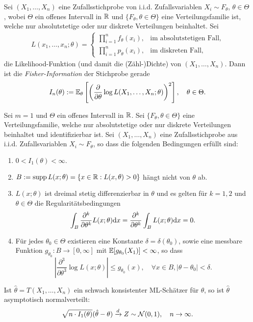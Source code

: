 \begin{defn}
  Sei $(X_1, \ldots, X_n)$ eine Zufallsstichprobe von i.i.d. Zufallsvariablen
  $X_i \sim F_\theta$, $\theta \in \Theta$, wobei $\Theta$ ein offenes Intervall
  in $\mathbb{R}$ und $\{ F_\theta, \theta \in \Theta \}$ eine Verteilungsfamilie
  ist, welche nur absolutstetige oder nur diskrete Verteilungen beinhaltet.
  Sei
  \[ \begin{aligned}
      L(x_1, \ldots, x_n; \theta) = \begin{cases}
        \prod_{i=1}^n f_\theta(x_i), &
        \text{im absolutstetigen Fall,} \\
        \prod_{i=1}^n p_\theta(x_i), &
        \text{im diskreten Fall,}
      \end{cases}
    \end{aligned}
  \]
  die Likelihood-Funktion (und damit die (Zähl-)Dichte) von $(X_1, \ldots,
  X_n)$. Dann ist die \emph{Fisher-Information} der Stichprobe gerade
  \[ I_n(\theta) := \mathbb{E}_\theta \left[ 
      \left( \frac{\partial }{\partial \theta} \log L(X_1, \ldots, X_n; \theta) \right)^2
    \right], \quad \theta \in \Theta. \]
\end{defn}

\begin{thm} 
  Sei $m=1$ und $\Theta$ ein offenes Intervall in $\mathbb{R}$. Sei $\{ F_\theta,
  \theta \in \Theta \}$ eine Verteilungsfamilie, welche nur absolutstetige oder
  nur diskrete Verteilungen beinhaltet und identifizierbar ist. Sei
  $(X_1, \ldots, X_n)$ eine Zufallsstichprobe aus i.i.d. Zufallsvariablen $X_i
  \sim F_\theta$, so dass die folgenden Bedingungen erfüllt sind:
  \begin{enumerate}
  \item $0 < I_1(\theta) < \infty$.
  \item $B := \operatorname{supp} L(x; \theta) = \{ x \in \mathbb{R} : L(x,\theta) >
    0 \}$ hängt nicht von $\theta$ ab.
  \item $L(x;\theta)$ ist dreimal stetig differenzierbar in $\theta$ und es
    gelten für $k = 1,2$ und $\theta \in \Theta$ die Regularitätsbedingungen
    \[ \int_B \frac{\partial^k}{\partial \theta^k} L(x;\theta) \mathrm{d} x
      = \frac{\partial^k}{\partial \theta^k} \int_B L(x;\theta) \mathrm{d} x =
      0. \]
  \item Für jedes $\theta_0 \in \Theta$ existieren eine Konstante $\delta =
    \delta( \theta_0 )$, sowie eine messbare Funktion $g_{\theta_0} : B \to
    [0, \infty]$ mit $\mathbb{E}[g_{\theta_0}(X_1)] < \infty$, so dass
    \[ \left| \frac{\partial^3}{\partial \theta^3} \log L(x;\theta) \right|
      \le g_{\theta_0} (x), \quad \forall x \in B, |\theta-\theta_0| < \delta. \]
  \end{enumerate}
  Ist $\hat{\theta} = T(X_1, \ldots, X_n)$ ein schwach konsistenter ML-Schätzer
  für $\theta$, so ist $\hat{\theta}$ asymptotisch normalverteilt:
  \[ \sqrt{n \cdot I_1(\theta)} (\hat{\theta} - \theta) \xrightarrow{d} Z \sim
    \mathcal{N}( 0, 1 ), \quad n \to \infty. \]
\end{thm}

